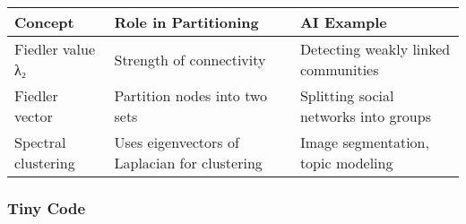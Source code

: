 \documentclass[
  letterpaper,
  DIV=11,
  numbers=noendperiod]{scrreprt}
\begin{document}
\begin{longtable}[]{@{}
  >{\raggedright\arraybackslash}p{}
  >{\raggedright\arraybackslash}p{}
  >{\raggedright\arraybackslash}p{}@{}}
\toprule\noalign{}
\begin{minipage}[b]{\linewidth}\raggedright
Concept
\end{minipage} & \begin{minipage}[b]{\linewidth}\raggedright
Role in Partitioning
\end{minipage} & \begin{minipage}[b]{\linewidth}\raggedright
AI Example
\end{minipage} \\
\midrule\noalign{}
\endhead
\bottomrule\noalign{}
\endlastfoot
Fiedler value λ₂ & Strength of connectivity & Detecting weakly linked
communities \\
Fiedler vector & Partition nodes into two sets & Splitting social
networks into groups \\
Spectral clustering & Uses eigenvectors of Laplacian for clustering &
Image segmentation, topic modeling \\
\end{longtable}

\subsubsection{Tiny Code}\label{tiny-code-166}
\end{document}
